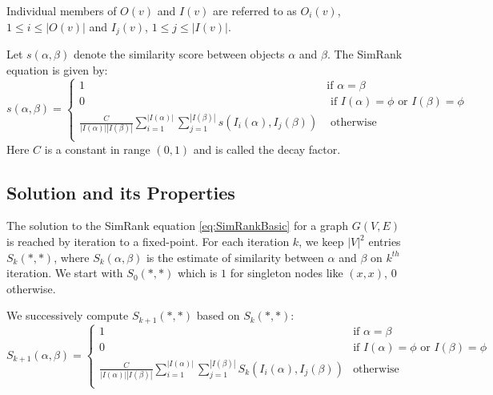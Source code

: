 Individual members of $O(v)$ and $I(v)$ are referred to as $O_i(v)$, $1\leq i \leq |O(v)|$ and $I_j(v)$, $1\leq j \leq |I(v)|$.

Let $s(\alpha,\beta)$ denote the similarity score between objects $\alpha$ and $\beta$. The SimRank equation is given by: 
\begin{equation} \label{eq:SimRankBasic}
s(\alpha,\beta) =
\left\{ \begin{array}{rl}
1 & \mbox{if } \alpha=\beta \\
0 &  \mbox{ if } I(\alpha)=\phi \mbox{ or } I(\beta)=\phi \\
\frac{C}{|I(\alpha)||I(\beta)|}\sum_{i=1}^{|I(\alpha)|}\sum_{j=1}^{|I(\beta)|} s(I_i(\alpha),I_j(\beta)) & \mbox{ otherwise } \\
\end{array}\right.
\end{equation}
Here $C$ is a constant in range $(0,1)$ and is called the decay factor.

\subsection{Solution and its Properties}
\label{section:SimRankSolutionsAndProperties}
The solution to the SimRank equation \ref{eq:SimRankBasic} for a graph $G(V,E)$ is reached by iteration to a fixed-point. For each iteration $k$, we keep ${|V|}^2$ entries $S_k(\ast,\ast)$, where $S_k(\alpha,\beta)$ is the estimate of similarity between $\alpha$ and $\beta$ on $k^{th}$ iteration.
We start with $S_0(\ast,\ast)$ which is $1$ for singleton nodes like $(x,x)$, $0$ otherwise.

We successively compute $S_{k+1}(\ast,\ast)$ based on $S_k(\ast,\ast)$:
\begin{equation} \label{eq:SimRankBasicRecursive}
S_{k+1}(\alpha,\beta) =
\left\{ \begin{array}{rl}
1 & \mbox{if } \alpha=\beta \\
0 &  \mbox{if } I(\alpha)=\phi \mbox{ or } I(\beta)=\phi \\
\frac{C}{|I(\alpha)||I(\beta)|}\sum_{i=1}^{|I(\alpha)|}\sum_{j=1}^{|I(\beta)|} S_k(I_i(\alpha),I_j(\beta)) & \mbox{otherwise } \\
\end{array}\right.
\end{equation}

